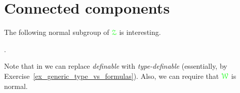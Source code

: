 \begin{comment}
\begin{proof}
  Assume inductively that $\mrD\cap{\gr g'}{\cdot}\mrD$ is $H$-wide, where ${\gr g'}\in\<\,({\gr g})_{K}^2\>$.
  Pick two arbitrary ${\gr a},{\gr b}\in({\gr g})_K$.
  We claim that $\mrD\cap{\gr a}{\cdot}{\gr b}{\cdot}{\gr g'}{\cdot}\mrD$ is $H$-wide.
  From the induction hypothesis it follows that ${\gr b}{\cdot}\mrD\cap{\gr b}{\cdot}{\gr g'}{\cdot}\mrD$ is $H$-wide.
  By Fact~\ref{prop_wideHcojugate_symm}, ${\gr a^{-1}}{\cdot}\mrD\cap{\gr b}{\cdot}{\gr g'}{\cdot}\mrD$ is $H$-wide and the claim follows.
\end{proof}
\end{comment}

\section{Connected components}

The following normal subgroup of ${\color{green}\EuScript Z}$ is interesting.

\begin{definition}\label{def_G0}\noindent\vspace*{0.1ex}

  .\smallskip

\end{definition}

Note that in  we can replace \textit{definable\/} with \textit{type-definable\/} (essentially, by Exercise~\ref{ex_generic_type_vs_formulas}).
Also, we can require that ${\color{green}\EuScript W}$ is normal.


  

